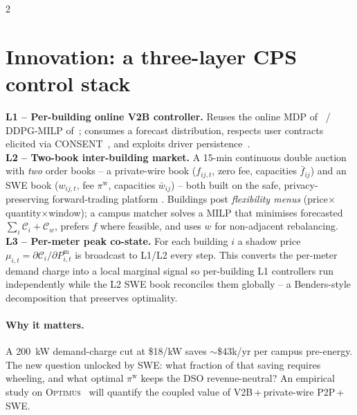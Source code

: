 \documentclass[10pt]{article}
\begin{document}
\begin{multicols}{2}
\section*{Innovation: a three-layer CPS control stack}
\textbf{L1 -- Per-building online V2B controller.} Reuses the online MDP
of~\cite{sen2025iccps} / DDPG-MILP of~\cite{liu2024reinforcement}; consumes
a forecast distribution, respects user contracts elicited via
CONSENT~\cite{sen2026negotiations}, and exploits driver
persistence~\cite{iccps2026_pv2b}.\\
\textbf{L2 -- Two-book inter-building market.} A 15-min continuous double
auction with \emph{two} order books -- a private-wire book ($f_{ij,t}$,
zero fee, capacities $\bar{f}_{ij}$) and an SWE book ($w_{ij,t}$, fee
$\pi^{\text{w}}$, capacities $\bar{w}_{ij}$) -- both built on the safe,
privacy-preserving forward-trading platform
\cite{eisele2020Safe,laszka2018transax}. Buildings post \emph{flexibility
menus} (price$\times$quantity$\times$window); a campus matcher solves a
MILP that minimises forecasted $\sum_i\mathcal{C}_i+\mathcal{C}_w$, prefers
$f$ where feasible, and uses $w$ for non-adjacent rebalancing.\\
\textbf{L3 -- Per-meter peak co-state.} For each building $i$ a shadow
price $\mu_{i,t}\!=\!\partial\mathcal{C}_i/\partial P^{\text{m}}_{i,t}$
is broadcast to L1/L2 every step. This converts the per-meter demand
charge into a local marginal signal so per-building L1 controllers run
independently while the L2 SWE book reconciles them globally -- a
Benders-style decomposition that preserves optimality.

\paragraph{Why it matters.} A 200~kW demand-charge cut at \$18/kW saves
$\sim$\$43k/yr per campus pre-energy. The new question unlocked by SWE:
what fraction of that saving requires wheeling, and what optimal
$\pi^{\text{w}}$ keeps the DSO revenue-neutral? An empirical study on
\textsc{Optimus}~\cite{talusan2024smartcomp,sen2025iccps,iccps2026_pv2b,liu2024reinforcement}
will quantify the coupled value of V2B\,+\,private-wire P2P\,+\,SWE.

{\scriptsize}
\end{multicols}
\end{document}

